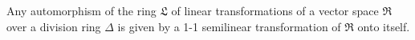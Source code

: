 Any automorphism of the ring $\mathfrak{L}$ of linear transformations of a vector space $\mathfrak{R}$ over a division ring $\Delta$ is given by a 1-1 semilinear transformation of $\mathfrak{R}$ onto itself.
